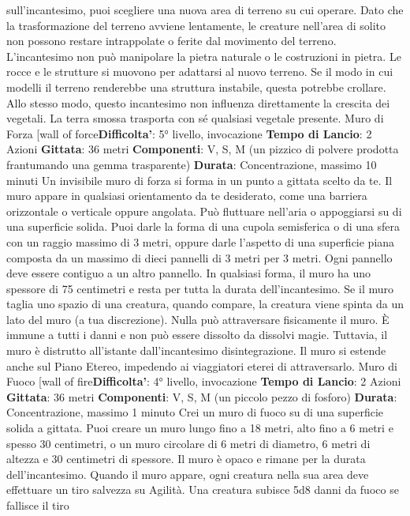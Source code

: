\begin{multicols}{2}
sull’incantesimo, puoi scegliere una nuova area di
terreno su cui operare.
Dato che la trasformazione del terreno avviene
lentamente, le creature nell’area di solito non possono
restare intrappolate o ferite dal movimento del terreno.
L’incantesimo non può manipolare la pietra naturale o
le costruzioni in pietra. Le rocce e le strutture si
muovono per adattarsi al nuovo terreno. Se il modo in
cui modelli il terreno renderebbe una struttura instabile,
questa potrebbe crollare.
Allo stesso modo, questo incantesimo non influenza
direttamente la crescita dei vegetali. La terra smossa
trasporta con sé qualsiasi vegetale presente.
Muro di Forza
[wall of force\textbf{Difficolta'}:
5° livello, invocazione
\textbf{Tempo di Lancio}: 2 Azioni
\textbf{Gittata}: 36 metri
\textbf{Componenti}: V, S, M (un pizzico di polvere prodotta
frantumando una gemma trasparente)
\textbf{Durata}: Concentrazione, massimo 10 minuti
Un invisibile muro di forza si forma in un punto a gittata
scelto da te. Il muro appare in qualsiasi orientamento
da te desiderato, come una barriera orizzontale o
verticale oppure angolata. Può fluttuare nell’aria o
appoggiarsi su di una superficie solida. Puoi darle la
forma di una cupola semisferica o di una sfera con un
raggio massimo di 3 metri, oppure darle l’aspetto di una
superficie piana composta da un massimo di dieci
pannelli di 3 metri per 3 metri. Ogni pannello deve
essere contiguo a un altro pannello. In qualsiasi forma,
il muro ha uno spessore di 75 centimetri e resta per
tutta la durata dell’incantesimo. Se il muro taglia uno
spazio di una creatura, quando compare, la creatura
viene spinta da un lato del muro (a tua discrezione).
Nulla può attraversare fisicamente il muro. È immune a
tutti i danni e non può essere dissolto da dissolvi magie.
Tuttavia, il muro è distrutto all’istante dall’incantesimo
disintegrazione. Il muro si estende anche sul Piano
Etereo, impedendo ai viaggiatori eterei di attraversarlo.
Muro di Fuoco
[wall of fire\textbf{Difficolta'}:
4° livello, invocazione
\textbf{Tempo di Lancio}: 2 Azioni
\textbf{Gittata}: 36 metri
\textbf{Componenti}: V, S, M (un piccolo pezzo di fosforo)
\textbf{Durata}: Concentrazione, massimo 1 minuto
Crei un muro di fuoco su di una superficie solida a
gittata. Puoi creare un muro lungo fino a 18 metri, alto
fino a 6 metri e spesso 30 centimetri, o un muro
circolare di 6 metri di diametro, 6 metri di altezza e 30
centimetri di spessore. Il muro è opaco e rimane per la
durata dell’incantesimo.
Quando il muro appare, ogni creatura nella sua area
deve effettuare un tiro salvezza su Agilità. Una
creatura subisce 5d8 danni da fuoco se fallisce il tiro

\end{multicols}
